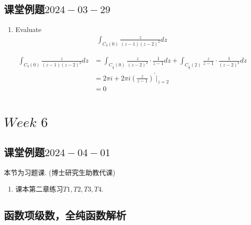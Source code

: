\section{课堂例题$2024-03-29$}
	\begin{enumerate}
		\item Evaluate 
		\begin{align}
			\int_{C_{3}(0)}{\frac{z}{(z - 1)(z - 2)^2} dz}
		\end{align}
	
		\vspace{2em}
		\begin{solution}
			\begin{align}
				\int_{C_{3}(0)}{\frac{z}{(z - 1)(z - 2)^2} dz}
				&= \int_{C_{\frac{1}{3}}(0)}{\frac{z}{(z - 2)^2} \cdot \frac{1}{z - 1} dz} + \int_{C_{\frac{1}{3}}(2)}{\frac{z}{z - 1} \cdot \frac{1}{(z - 2)^2} dz} \\
				&= 2\pi i + 2\pi i \left( \frac{z}{z - 1} \right)^{'} \Big|_{z = 2} \\
				&= 0
			\end{align}
		\end{solution}
	\end{enumerate}

\chapter{$Week \,\, 6$}
\section{课堂例题$2024-04-01$}
	\begin{center}
		本节为习题课. (博士研究生助教代课)
	\end{center}
	\begin{enumerate}
		\item 课本第二章练习$T1 , T2 , T3 , T4$.
	\end{enumerate}

\newpage

\section{函数项级数，全纯函数解析}
